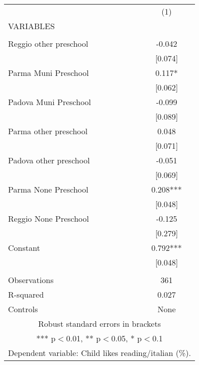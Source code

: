 \begin{tabular}{lc} \hline
 & (1) \\
VARIABLES &  \\ \hline
 &  \\
Reggio other preschool & -0.042 \\
 & [0.074] \\
Parma Muni Preschool & 0.117* \\
 & [0.062] \\
Padova Muni Preschool & -0.099 \\
 & [0.089] \\
Parma other preschool & 0.048 \\
 & [0.071] \\
Padova other preschool & -0.051 \\
 & [0.069] \\
Parma None Preschool & 0.208*** \\
 & [0.048] \\
Reggio None Preschool & -0.125 \\
 & [0.279] \\
Constant & 0.792*** \\
 & [0.048] \\
 &  \\
Observations & 361 \\
R-squared & 0.027 \\
 Controls & None \\ \hline
\multicolumn{2}{c}{ Robust standard errors in brackets} \\
\multicolumn{2}{c}{ *** p$<$0.01, ** p$<$0.05, * p$<$0.1} \\
\multicolumn{2}{c}{ Dependent variable: Child likes reading/italian (\%).} \\
\end{tabular}
